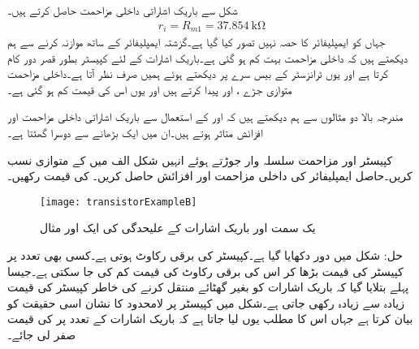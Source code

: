 شکل سے باریک اشاراتی داخلی مزاحمت حاصل کرتے ہیں۔
\begin{align*}
r_i=R_{m1}=\SI{37.854}{\kilo \ohm}
\end{align*}
جہاں  کو ایمپلیفائر کا حصہ نہیں تصور کیا گیا ہے۔گزشتہ ایمپلیفائر کے ساتھ موازنہ کرنے سے ہم دیکھتے ہیں کہ داخلی مزاحمت بہت کم ہو گئی ہے۔باریک اشارات کے لئے کپیسٹر  بطور قصر دور کام کرتا ہے اور یوں ٹرانزسٹر کے بیس سرے پر دیکھتے ہوئے ہمیں صرف  نظر آتا ہے۔داخلی مزاحمت متوازی جڑے ، اور  پیدا کرتے ہیں اور یوں اس کی قیمت کم ہو گئی ہے۔

مندرجہ بالا دو مثالوں سے ہم دیکھتے ہیں کہ  اور  کے استعمال سے باریک اشاراتی داخلی مزاحمت   اور افزائش   متاثر ہوتے ہیں۔ان میں ایک بڑھانے سے دوسرا گھٹتا ہے۔ 



کپیسٹر   اور مزاحمت   سلسلہ وار جوڑتے ہوئے انہیں شکل  الف میں   کے متوازی نسب کریں۔حاصل ایمپلیفائر کی داخلی مزاحمت  اور افزائش   حاصل کریں۔  کی قیمت   رکھیں۔
\begin{figure}
\centering
\texttt{[image: transistorExampleB]}
\caption{یک سمت اور باریک اشارات کے علیحدگی کی ایک اور مثال}
\label{شکل_مثال_کا_دور_ب}
\end{figure}
حل: شکل   میں دور دکھایا گیا ہے۔کپیسٹر کی برقی رکاوٹ  ہوتی ہے۔کسی بھی تعدد پر کپیسٹر کی قیمت بڑھا کر اس کی برقی رکاوٹ کی قیمت کم کی جا سکتی ہے۔جیسا پہلے بتلایا گیا کہ باریک اشارات کو بغیر گھٹائے منتقل کرنے کی خاطر کپیسٹر کی قیمت زیادہ سے زیادہ رکھی جاتی ہے۔شکل میں کپیسٹر پر لامحدود کا نشان  اسی حقیقت کو بیان کرتا ہے جہاں اس کا مطلب یوں لیا جاتا ہے کہ باریک اشارات کے تعدد پر  کی قیمت صفر لی جائے۔

